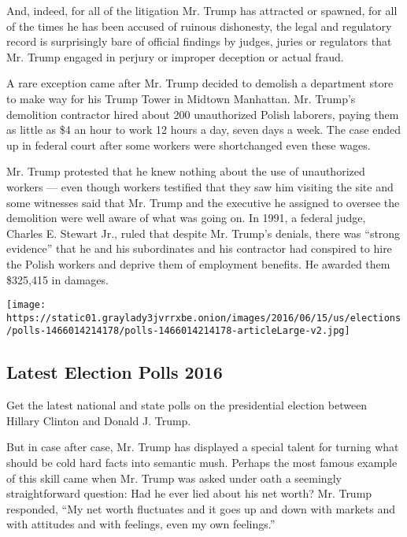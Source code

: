 And, indeed, for all of the litigation Mr. Trump has attracted or
spawned, for all of the times he has been accused of ruinous dishonesty,
the legal and regulatory record is surprisingly bare of official
findings by judges, juries or regulators that Mr. Trump engaged in
perjury or improper deception or actual fraud.

A rare exception came after Mr. Trump decided to demolish a department
store to make way for his Trump Tower in Midtown Manhattan. Mr. Trump's
demolition contractor hired about 200 unauthorized Polish laborers,
paying them as little as \$4 an hour to work 12 hours a day, seven days
a week. The case ended up in federal court after some workers were
shortchanged even these wages.

Mr. Trump protested that he knew nothing about the use of unauthorized
workers --- even though workers testified that they saw him visiting the
site and some witnesses said that Mr. Trump and the executive he
assigned to oversee the demolition were well aware of what was going on.
In 1991, a federal judge, Charles E. Stewart Jr., ruled that despite Mr.
Trump's denials, there was ``strong evidence'' that he and his
subordinates and his contractor had conspired to hire the Polish workers
and deprive them of employment benefits. He awarded them \$325,415 in
damages.

\href{https://www.nytimes3xbfgragh.onion/interactive/2016/us/elections/polls.html}{}

\texttt{[image: https://static01.graylady3jvrrxbe.onion/images/2016/06/15/us/elections/polls-1466014214178/polls-1466014214178-articleLarge-v2.jpg]}

\hypertarget{latest-election-polls-2016}{%
\subsection{Latest Election Polls
2016}\label{latest-election-polls-2016}}

Get the latest national and state polls on the presidential election
between Hillary Clinton and Donald J. Trump.

But in case after case, Mr. Trump has displayed a special talent for
turning what should be cold hard facts into semantic mush. Perhaps the
most famous example of this skill came when Mr. Trump was asked under
oath a seemingly straightforward question: Had he ever lied about his
net worth? Mr. Trump responded, ``My net worth fluctuates and it goes up
and down with markets and with attitudes and with feelings, even my own
feelings.''

